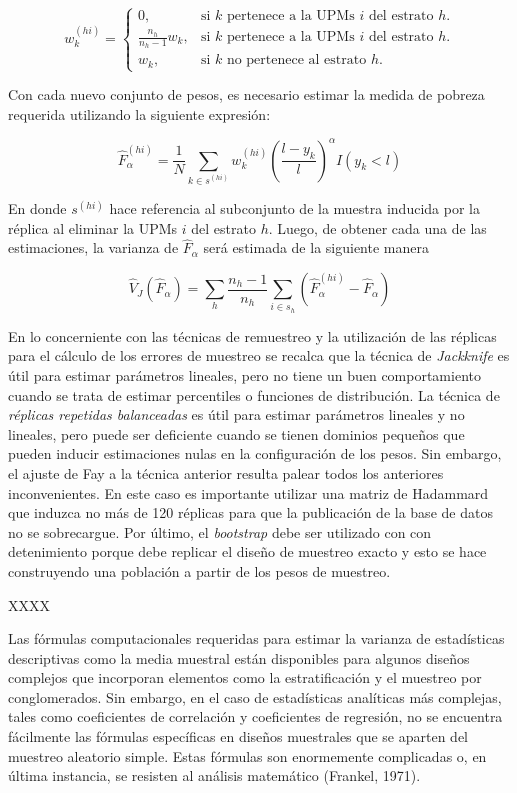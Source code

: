 \[
w_{k}^{(hi)} = 
\begin{cases}
0, & \text{si $k$ pertenece a la UPMs $i$ del estrato $h$.} \\
\frac{n_h}{n_h-1}w_k, & \text{si $k$ pertenece a la UPMs $i$ del estrato $h$.} \\
w_k, & \text{si $k$ no pertenece al estrato $h$.} 
\end{cases}
\]

Con cada nuevo conjunto de pesos, es necesario estimar la medida de pobreza requerida utilizando la siguiente expresión:

\[
\hat{F}_{\alpha}^{(hi)}=\frac{1}{N}\sum_{k\in s^{(hi)}} w_k^{(hi)} 
\left(\frac{l-y_k}{l}\right)^{\alpha}I(y_k<l)
\]

En donde \(s^{(hi)}\) hace referencia al subconjunto de la muestra inducida por la réplica al eliminar la UPMs \(i\) del estrato \(h\). Luego, de obtener cada una de las estimaciones, la varianza de \(\hat{F}_{\alpha}\) será estimada de la siguiente manera

\[
\hat{V}_{J}(\hat{F}_{\alpha})=\sum_{h}\frac{n_h-1}{n_h}
\sum_{i\in s_h} \left(\hat{F}_{\alpha}^{(hi)} - \hat{F}_{\alpha}\right)
\]

En lo concerniente con las técnicas de remuestreo y la utilización de las réplicas para el cálculo de los errores de muestreo se recalca que la técnica de \emph{Jackknife} es útil para estimar parámetros lineales, pero no tiene un buen comportamiento cuando se trata de estimar percentiles o funciones de distribución. La técnica de \emph{réplicas repetidas balanceadas} es útil para estimar parámetros lineales y no lineales, pero puede ser deficiente cuando se tienen dominios pequeños que pueden inducir estimaciones nulas en la configuración de los pesos. Sin embargo, el ajuste de Fay a la técnica anterior resulta palear todos los anteriores inconvenientes. En este caso es importante utilizar una matriz de Hadammard que induzca no más de 120 réplicas para que la publicación de la base de datos no se sobrecargue. Por último, el \emph{bootstrap} debe ser utilizado con con detenimiento porque debe replicar el diseño de muestreo exacto y esto se hace construyendo una población a partir de los pesos de muestreo.

XXXX

Las fórmulas computacionales requeridas para estimar la varianza de estadísticas descriptivas como la media muestral están disponibles para algunos diseños complejos que incorporan elementos como la estratificación y el muestreo por conglomerados. Sin embargo, en el caso de estadísticas analíticas más complejas, tales como coeficientes de correlación y coeficientes de regresión, no se encuentra fácilmente las fórmulas específicas en diseños muestrales que se aparten del muestreo aleatorio simple. Estas fórmulas son enormemente complicadas o, en última instancia, se resisten al análisis matemático (Frankel, 1971).

